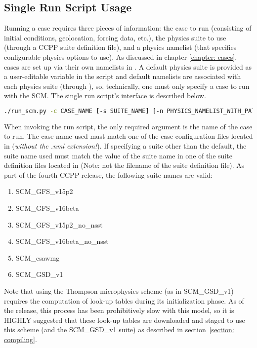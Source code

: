 \subsection{Single Run Script Usage} \label{subsection: singlerunscript}
Running a case requires three pieces of information: the case to run (consisting of initial conditions, geolocation, forcing data, etc.), the physics suite to use (through a CCPP suite definition file), and a physics namelist (that specifies configurable physics options to use). As discussed in chapter \ref{chapter: cases}, cases are set up via their own namelists in . A default physics suite is provided as a user-editable variable in the script and default namelists are associated with each physics suite (through ), so, technically, one must only specify a case to run with the SCM. The single run script's interface is described below.

\begin{lstlisting}[language=bash]
./run_scm.py -c CASE_NAME [-s SUITE_NAME] [-n PHYSICS_NAMELIST_WITH_PATH] [-g] [-d]
\end{lstlisting}

When invoking the run script, the only required argument is the name of the case to run. The case name used must match one of the case configuration files located in  (\emph{without the .nml extension!}). If specifying a suite other than the default, the suite name used must match the value of the suite name in one of the suite definition files located in  (Note: not the filename of the suite definition file). As part of the fourth CCPP release, the following suite names are valid:
\begin{enumerate}
\item SCM\_GFS\_v15p2
\item SCM\_GFS\_v16beta
\item SCM\_GFS\_v15p2\_no\_nsst
\item SCM\_GFS\_v16beta\_no\_nsst
\item SCM\_csawmg
\item SCM\_GSD\_v1
\end{enumerate}

Note that using the Thompson microphysics scheme (as in SCM\_GSD\_v1) requires the computation of look-up tables during its initialization phase. As of the release, this process has been prohibitively slow with this model, so it is HIGHLY suggested that these look-up tables are downloaded and staged to use this scheme (and the SCM\_GSD\_v1 suite) as described in section~\ref{section: compiling}.

